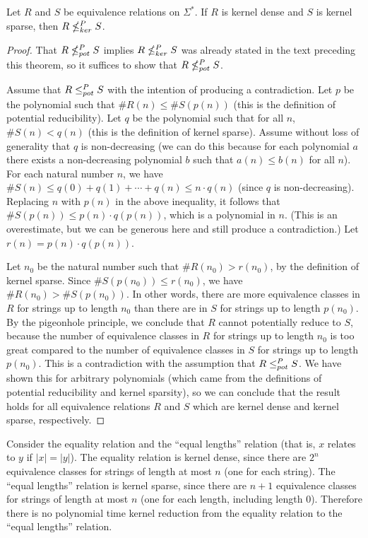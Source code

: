 \begin{theorem}\label{thm:density}
  Let $R$ and $S$ be equivalence relations on $\Sigma^*$.
  If $R$ is kernel dense and $S$ is kernel sparse, then $R\nleq^{P}_{ker} S$.
\end{theorem}
\begin{proof}
  That $R\nleq^{P}_{pot} S$ implies $R\nleq^{P}_{ker} S$ was already stated in the text preceding this theorem, so it suffices to show that $R\nleq^{P}_{pot} S$.

  Assume that $R\leq^{P}_{pot} S$ with the intention of producing a contradiction.
  Let $p$ be the polynomial such that $\#R(n)\leq \#S(p(n))$ (this is the definition of potential reducibility).
  Let $q$ be the polynomial such that for all $n$, $\#S(n)< q(n)$ (this is the definition of kernel sparse).
  Assume without loss of generality that $q$ is non-decreasing (we can do this because for each polynomial $a$ there exists a non-decreasing polynomial $b$ such that $a(n)\leq b(n)$ for all $n$).
  For each natural number $n$, we have $\#S(n) \leq q(0) + q(1) + \cdots + q(n) \leq n \cdot q(n)$ (since $q$ is non-decreasing).
  Replacing $n$ with $p(n)$ in the above inequality, it follows that $\#S(p(n)) \leq p(n) \cdot q(p(n))$, which is a polynomial in $n$.
  (This is an overestimate, but we can be generous here and still produce a contradiction.)
  Let $r(n)=p(n)\cdot q(p(n))$.

  Let $n_0$ be the natural number such that $\#R(n_0) > r(n_0)$, by the definition of kernel sparse.
  Since $\#S(p(n_0)) \leq r(n_0)$, we have $\#R(n_0) > \#S(p(n_0))$.
  In other words, there are more equivalence classes in $R$ for strings up to length $n_0$ than there are in $S$ for strings up to length $p(n_0)$.
  By the pigeonhole principle, we conclude that $R$ cannot potentially reduce to $S$, because the number of equivalence classes in $R$ for strings up to length $n_0$ is too great compared to the number of equivalence classes in $S$ for strings up to length $p(n_0)$.
  This is a contradiction with the assumption that $R\leq^{P}_{pot} S$.
  We have shown this for arbitrary polynomials (which came from the definitions of potential reducibility and kernel sparsity), so we can conclude that the result holds for all equivalence relations $R$ and $S$ which are kernel dense and kernel sparse, respectively.
\end{proof}

\begin{example}
  Consider the equality relation and the ``equal lengths'' relation (that is, $x$ relates to $y$ if $|x| = |y|$).
  The equality relation is kernel dense, since there are $2^n$ equivalence classes for strings of length at most $n$ (one for each string).
  The ``equal lengths'' relation is kernel sparse, since there are $n + 1$ equivalence classes for strings of length at most $n$ (one for each length, including length $0$).
  Therefore there is no polynomial time kernel reduction from the equality relation to the ``equal lengths'' relation.
\end{example}


